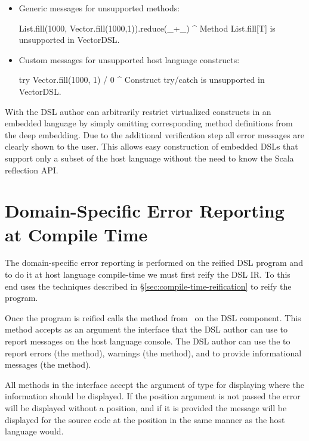 \begin{itemize}
\item Generic messages for unsupported methods:\begin{lstparagraph}
List.fill(1000, Vector.fill(1000,1)).reduce(_+_)
^
Method List.fill[T] is unsupported in VectorDSL.
\end{lstparagraph}

\item Custom messages for unsupported host language constructs:\begin{lstparagraph}
try Vector.fill(1000, 1) / 0
^
Construct try/catch is unsupported in VectorDSL.
\end{lstparagraph}
\end{itemize}
%
With \yy the DSL author can arbitrarily restrict virtualized constructs in an
embedded language by simply omitting corresponding method definitions from the
deep embedding. Due to the additional verification step all error messages are
clearly shown to the user. This allows easy construction of embedded DSLs that
support only a subset of the host language without the need to know the Scala
reflection API.

\section{Domain-Specific Error Reporting at Compile Time}
\label{sec:domain-specific-error-reporting}

The domain-specific error reporting is performed on the reified DSL program and to do it
at host language compile-time we must first reify the DSL IR. To this end \yy uses
the techniques described in \S \ref{sec:compile-time-reification} to reify the program.


Once the program is reified \yy calls the  method from~ on the DSL component. This method accepts as an argument the  interface that the  DSL
author can use to report messages on the host language console. The DSL author can use
the  to report errors (the  method), warnings (the  method),
and to provide informational messages (the  method).


All methods in the  interface accept the  argument of type 
 for displaying where the information should be displayed. If the position argument
 is not passed the error will be displayed without a position, and if it is provided the
 message will be displayed for the source code at the position in the same manner
 as the host language would.

